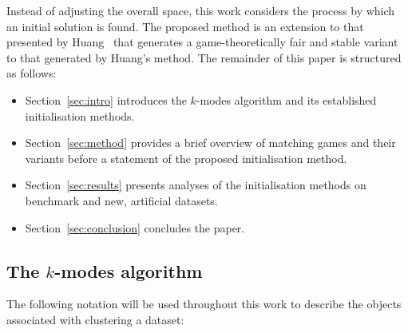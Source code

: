 Instead of adjusting the overall space, this work considers the process by which
an initial solution is found. The proposed method is an extension to that
presented by Huang~\cite{Huang1998} that generates a game-theoretically fair and
stable variant to that generated by Huang's method. The remainder of this paper
is structured as follows:
\begin{itemize}
    \item Section~\ref{sec:intro} introduces the \(k\)-modes algorithm and its
        established initialisation methods.
    \item Section~\ref{sec:method} provides a brief overview of
        matching games and their variants before a statement of the proposed
        initialisation method.
    \item Section~\ref{sec:results} presents analyses of the initialisation
        methods on benchmark and new, artificial datasets.
    \item Section~\ref{sec:conclusion} concludes the paper.
\end{itemize}


\subsection{The \(k\)-modes algorithm}\label{subsec:kmodes}

The following notation will be used throughout this work to describe the objects
associated with clustering a dataset:

